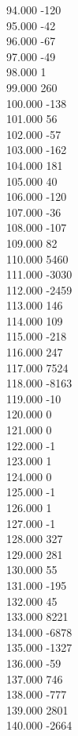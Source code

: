 { 94.000	-120 \\
 95.000	-42 \\
 96.000	-67 \\
 97.000	-49 \\
 98.000	1 \\
 99.000	260 \\
 100.000	-138 \\
 101.000	56 \\
 102.000	-57 \\
 103.000	-162 \\
 104.000	181 \\
 105.000	40 \\
 106.000	-120 \\
 107.000	-36 \\
 108.000	-107 \\
 109.000	82 \\
 110.000	5460 \\
 111.000	-3030 \\
 112.000	-2459 \\
 113.000	146 \\
 114.000	109 \\
 115.000	-218 \\
 116.000	247 \\
 117.000	7524 \\
 118.000	-8163 \\
 119.000	-10 \\
 120.000	0 \\
 121.000	0 \\
 122.000	-1 \\
 123.000	1 \\
 124.000	0 \\
 125.000	-1 \\
 126.000	1 \\
 127.000	-1 \\
 128.000	327 \\
 129.000	281 \\
 130.000	55 \\
 131.000	-195 \\
 132.000	45 \\
 133.000	8221 \\
 134.000	-6878 \\
 135.000	-1327 \\
 136.000	-59 \\
 137.000	746 \\
 138.000	-777 \\
 139.000	2801 \\
 140.000	-2664 \\
}
